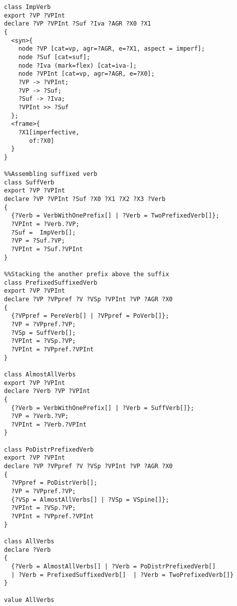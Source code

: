 \begin{lstlisting}[style=AppendixStyle]
%%Adding imperfective suffix
class ImpVerb
export ?VP ?VPInt
declare ?VP ?VPInt ?Suf ?Iva ?AGR ?X0 ?X1
{
  <syn>{
    node ?VP [cat=vp, agr=?AGR, e=?X1, aspect = imperf];
    node ?Suf [cat=suf];
    node ?Iva (mark=flex) [cat=iva-];
    node ?VPInt [cat=vp, agr=?AGR, e=?X0];
    ?VP -> ?VPInt;
    ?VP -> ?Suf;
    ?Suf -> ?Iva;
    ?VPInt >> ?Suf
  };
  <frame>{
    ?X1[imperfective,
       of:?X0]
  }
}

%%Assembling suffixed verb
class SuffVerb
export ?VP ?VPInt 
declare ?VP ?VPInt ?Suf ?X0 ?X1 ?X2 ?X3 ?Verb 
{
  {?Verb = VerbWithOnePrefix[] | ?Verb = TwoPrefixedVerb[]};
  ?VPInt = ?Verb.?VP;
  ?Suf =  ImpVerb[];
  ?VP = ?Suf.?VP;
  ?VPInt = ?Suf.?VPInt
}

%%Stacking the another prefix above the suffix
class PrefixedSuffixedVerb
export ?VP ?VPInt
declare ?VP ?VPpref ?V ?VSp ?VPInt ?VP ?AGR ?X0 
{
  {?VPpref = PereVerb[] | ?VPpref = PoVerb[]};
  ?VP = ?VPpref.?VP;
  ?VSp = SuffVerb[];
  ?VPInt = ?VSp.?VP;
  ?VPInt = ?VPpref.?VPInt
}

class AlmostAllVerbs
export ?VP ?VPInt
declare ?Verb ?VP ?VPInt
{
  {?Verb = VerbWithOnePrefix[] | ?Verb = SuffVerb[]};
  ?VP = ?Verb.?VP;
  ?VPInt = ?Verb.?VPInt
}

class PoDistrPrefixedVerb
export ?VP ?VPInt
declare ?VP ?VPpref ?V ?VSp ?VPInt ?VP ?AGR ?X0
{
  ?VPpref = PoDistrVerb[];
  ?VP = ?VPpref.?VP;
  {?VSp = AlmostAllVerbs[] | ?VSp = VSpine[]};
  ?VPInt = ?VSp.?VP;
  ?VPInt = ?VPpref.?VPInt
}

class AllVerbs
declare ?Verb
{
  {?Verb = AlmostAllVerbs[] | ?Verb = PoDistrPrefixedVerb[] 
  | ?Verb = PrefixedSuffixedVerb[]  | ?Verb = TwoPrefixedVerb[]}
}

value AllVerbs
\end{lstlisting}
